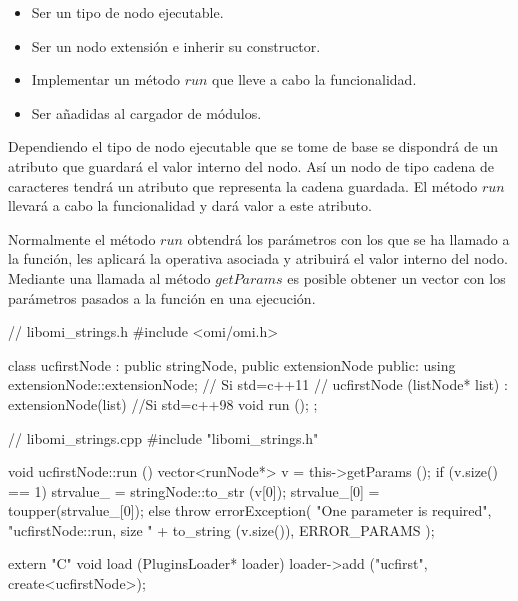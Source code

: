 \begin{itemize}
\item Ser un tipo de nodo ejecutable. 
\item Ser un nodo extensión e inherir su constructor.
\item Implementar un método $run$ que lleve a cabo la funcionalidad.
\item Ser añadidas al cargador de módulos.
\end{itemize}

Dependiendo el tipo de nodo ejecutable que se tome de base se dispondrá 
de un atributo que guardará el valor interno del nodo. Así un nodo de tipo cadena
de caracteres tendrá un atributo que representa la cadena guardada. El método 
$run$ llevará a cabo la funcionalidad y dará valor a este atributo.

Normalmente el método $run$ obtendrá los parámetros con los que se ha llamado a la 
función, les aplicará la operativa asociada y atribuirá el valor interno del 
nodo. Mediante una llamada al método $getParams$ es posible obtener un vector
con los parámetros pasados a la función en una ejecución. \\

  

\lstset{language=cpp} 
\begin{myverbatim} 
   // libomi_strings.h
   #include <omi/omi.h>

   class ucfirstNode : public stringNode, public extensionNode {
      public:
         using extensionNode::extensionNode; // Si std=c++11
         // ucfirstNode (listNode* list) : extensionNode(list) {}  //Si std=c++98
         void run ();
   };
\end{myverbatim}

\begin{myverbatim}
   // libomi_strings.cpp
   #include "libomi_strings.h"
   
   void ucfirstNode::run () { 
      vector<runNode*> v = this->getParams ();
      if (v.size() == 1){
         strvalue_ = stringNode::to_str (v[0]);
         strvalue_[0] = toupper(strvalue_[0]);
      }else
          throw errorException(
            "One parameter is required", 
            "ucfirstNode::run, size " + to_string (v.size()), 
            ERROR_PARAMS
         );
   }  
   
   extern "C" void load (PluginsLoader* loader) {
      loader->add ("ucfirst", create<ucfirstNode>);
   }
\end{myverbatim}


